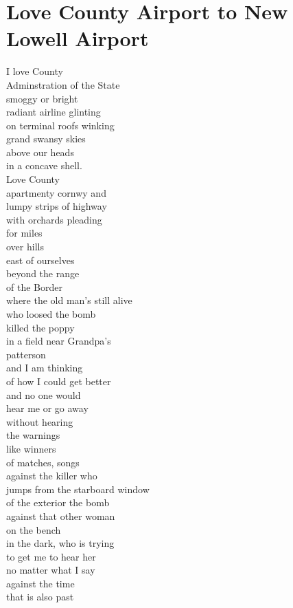\documentclass[smalldemyvopaper,11pt,twoside,onecolumn,openright,extrafontsizes]{memoir}
\begin{document}
\chapter{Love County Airport to New Lowell Airport}
I love County
\\Adminstration of the State
\\smoggy or bright
\\radiant airline glinting
\\on terminal roofs winking
\\grand swansy skies
\\above our heads
\\in a concave shell.
\\Love County
\\apartmenty cornwy and
\\lumpy strips of highway
\\with orchards pleading
\\for miles
\\over hills
\\east of ourselves
\\beyond the range
\\of the Border
\\where the old man's still alive
\\who loosed the bomb
\\killed the poppy
\\in a field near Grandpa's
\\patterson
\\and I am thinking
\\of how I could get better
\\and no one would
\\hear me or go away
\\without hearing
\\the warnings
\\like winners
\\of matches, songs
\\against the killer who
\\jumps from the starboard window
\\of the exterior the bomb
\\against that other woman
\\on the bench
\\in the dark, who is trying
\\to get me to hear her
\\no matter what I say
\\against the time
\\that is also past
\end{document}
